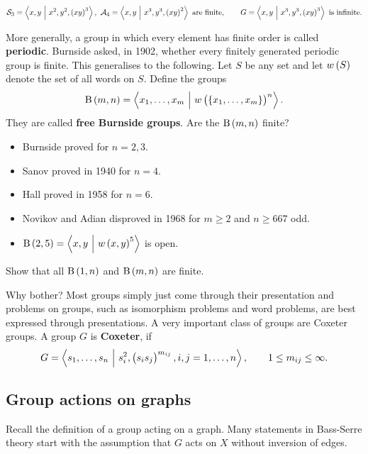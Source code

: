 \begin{example*}
$$ \SSS_3 = \abr{x, y \st x^2, y^2, \br{xy}^3}, \ \AAA_4 = \abr{x, y \st x^3, y^3, \br{xy}^2} \ \text{are finite}, \qquad G = \abr{x, y \st x^3, y^3, \br{xy}^3} \ \text{is infinite}. $$
\end{example*}

\pagebreak

\begin{remark}
More generally, a group in which every element has finite order is called \textbf{periodic}. Burnside asked, in 1902, whether every finitely generated periodic group is finite. This generalises to the following. Let $ S $ be any set and let $ w\br{S} $ denote the set of all words on $ S $. Define the groups
$$ \B\br{m, n} = \abr{x_1, \dots, x_m \st w\br{\cbr{x_1, \dots, x_m}}^n}. $$
They are called \textbf{free Burnside groups}. Are the $ \B\br{m, n} $ finite?
\begin{itemize}
\item Burnside proved for $ n = 2, 3 $.
\item Sanov proved in 1940 for $ n = 4 $.
\item Hall proved in 1958 for $ n = 6 $.
\item Novikov and Adian disproved in 1968 for $ m \ge 2 $ and $ n \ge 667 $ odd.
\item $ \B\br{2, 5} = \abr{x, y \st w\br{x, y}^5} $ is open.
\end{itemize}
\end{remark}

\begin{exercise}
Show that all $ \B\br{1, n} $ and $ \B\br{m, n} $ are finite.
\end{exercise}

Why bother? Most groups simply just come through their presentation and problems on groups, such as isomorphism problems and word problems, are best expressed through presentations. A very important class of groups are Coxeter groups. A group $ G $ is \textbf{Coxeter}, if
$$ G = \abr{s_1, \dots, s_n \st s_i^2, \br{s_is_j}^{m_{ij}}, i, j = 1, \dots, n}, \qquad 1 \le m_{ij} \le \infty. $$

\subsection{Group actions on graphs}

Recall the definition of a group acting on a graph. Many statements in Bass-Serre theory start with the assumption that $ G $ acts on $ X $ without inversion of edges.

